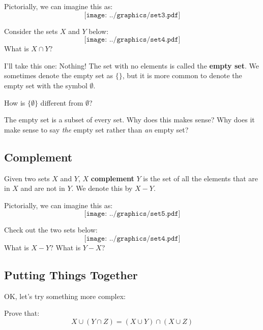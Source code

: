 Pictorially, we can imagine this as:
\[
\texttt{[image: ../graphics/set3.pdf]}
\]

\begin{question} Consider the sets $X$ and $Y$ below:
\[
\texttt{[image: ../graphics/set4.pdf]}
\]
What is $X\cap Y$?
\end{question}

I'll take this one: Nothing! The set with no elements is called the \textbf{empty set}. We sometimes denote the empty set as $\{\}$, but it is more common to denote the empty set with the symbol $\emptyset$.  

\begin{question}
How is $\{\emptyset\}$ different from $\emptyset$?  
\end{question}
\QM

\begin{question}
The empty set is a subset of every set.  Why does this makes sense?  Why does it make sense 
to say \emph{the} empty set rather than \emph{an} empty set?  
\end{question}
\QM


\subsection{Complement}
\begin{definition} Given two sets $X$ and $Y$, 
$X$ \textbf{complement} $Y$ is the set of all the elements that are in $X$ and are not in $Y$. We denote this by $X-Y$.
\end{definition}

Pictorially, we can imagine this as:
\[
\texttt{[image: ../graphics/set5.pdf]}
\]

\begin{question} Check out the two sets below:
\[
\texttt{[image: ../graphics/set4.pdf]}
\]
What is $X-Y$? What is $Y-X$?
\end{question}
\QM


\subsection{Putting Things Together}
OK, let's try something more complex:

\begin{question} Prove that:
\[
X\cup (Y \cap Z) = (X \cup Y)\cap (X \cup Z)
\]
\end{question}

